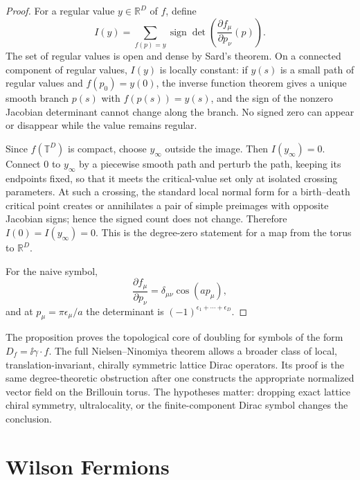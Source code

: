 \begin{proof}
For a regular value \(y\in\mathbb R^D\) of \(f\), define
\[
  I(y)=\sum_{f(p)=y}
  \operatorname{sign}\det
  \left(\frac{\partial f_\mu}{\partial p_\nu}(p)\right).
\]
The set of regular values is open and dense by Sard's theorem.  On a
connected component of regular values, \(I(y)\) is locally constant: if
\(y(s)\) is a small path of regular values and \(f(p_0)=y(0)\), the inverse
function theorem gives a unique smooth branch \(p(s)\) with
\(f(p(s))=y(s)\), and the sign of the nonzero Jacobian determinant cannot
change along the branch.  No signed zero can appear or disappear while the
value remains regular.

Since \(f(\mathbb T^D)\) is compact, choose \(y_\infty\) outside the image.
Then \(I(y_\infty)=0\).  Connect \(0\) to \(y_\infty\) by a piecewise smooth
path and perturb the path, keeping its endpoints fixed, so that it meets the
critical-value set only at isolated crossing parameters.  At such a crossing,
the standard local normal form for a birth--death critical point creates or
annihilates a pair of simple preimages with opposite Jacobian signs; hence
the signed count does not change.  Therefore \(I(0)=I(y_\infty)=0\).  This
is the degree-zero statement for a map from the torus to \(\mathbb R^D\).

For the naive symbol,
\[
  \frac{\partial f_\mu}{\partial p_\nu}
  =
  \delta_{\mu\nu}\cos(ap_\mu),
\]
and at \(p_\mu=\pi\epsilon_\mu/a\) the determinant is
\((-1)^{\epsilon_1+\cdots+\epsilon_D}\).
\end{proof}

\begin{remark}
The proposition proves the topological core of doubling for symbols of the
form \(D_f=\ii\gamma\cdot f\).  The full Nielsen--Ninomiya theorem allows a
broader class of local, translation-invariant, chirally symmetric lattice
Dirac operators.  Its proof is the same degree-theoretic obstruction after
one constructs the appropriate normalized vector field on the Brillouin
torus.  The hypotheses matter: dropping exact lattice chiral symmetry,
ultralocality, or the finite-component Dirac symbol changes the conclusion.
\end{remark}

\section{Wilson Fermions}

